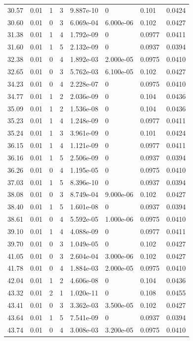 \documentclass[preview]{standalone}
\begin{document}
{{{\begin{tabular}{L{1.2cm}C{1.2cm} C{0.3cm}C{0.5cm} C{1.4cm}C{1.4cm} C{1.4cm}C{1.4cm}}
  30.57  &  0.01  & 1     &  3 &  9.887e-10  & 0  & 0.101 &  0.0424   \\ 
  30.60  &  0.01  & 0     &  3 &  6.069e-04  & 6.000e-06  & 0.102 &  0.0427   \\ 
  31.38  &  0.01  & 1     &  4 &  1.792e-09  & 0  & 0.0977 &  0.0411   \\ 
  31.60  &  0.01  & 1     &  5 &  2.132e-09  & 0  & 0.0937 &  0.0394   \\ 
  32.38  &  0.01  & 0     &  4 &  1.892e-03  & 2.000e-05  & 0.0975 &  0.0410   \\ 
  32.65  &  0.01  & 0     &  3 &  5.762e-03  & 6.100e-05  & 0.102 &  0.0427   \\ 
  34.23  &  0.01  & 0     &  4 &  2.228e-07  & 0  & 0.0975 &  0.0410   \\ 
  34.77  &  0.01  & 1     &  2 &  2.036e-09  & 0  & 0.104 &  0.0436   \\ 
  35.09  &  0.01  & 1     &  2 &  1.536e-08  & 0  & 0.104 &  0.0436   \\ 
  35.23  &  0.01  & 1     &  4 &  1.248e-09  & 0  & 0.0977 &  0.0411   \\ 
  35.24  &  0.01  & 1     &  3 &  3.961e-09  & 0  & 0.101 &  0.0424   \\ 
  36.15  &  0.01  & 1     &  4 &  1.121e-09  & 0  & 0.0977 &  0.0411   \\ 
  36.16  &  0.01  & 1     &  5 &  2.506e-09  & 0  & 0.0937 &  0.0394   \\ 
  36.26  &  0.01  & 0     &  4 &  1.195e-05  & 0  & 0.0975 &  0.0410   \\ 
  37.03  &  0.01  & 1     &  5 &  8.396e-10  & 0  & 0.0937 &  0.0394   \\ 
  38.08  &  0.01  & 0     &  3 &  8.749e-04  & 9.000e-06  & 0.102 &  0.0427   \\ 
  38.40  &  0.01  & 1     &  5 &  1.601e-08  & 0  & 0.0937 &  0.0394   \\ 
  38.61  &  0.01  & 0     &  4 &  5.592e-05  & 1.000e-06  & 0.0975 &  0.0410   \\ 
  39.10  &  0.01  & 1     &  4 &  4.088e-09  & 0  & 0.0977 &  0.0411   \\ 
  39.70  &  0.01  & 0     &  3 &  1.049e-05  & 0  & 0.102 &  0.0427   \\ 
  41.05  &  0.01  & 0     &  3 &  2.604e-04  & 3.000e-06  & 0.102 &  0.0427   \\ 
  41.78  &  0.01  & 0     &  4 &  1.884e-03  & 2.000e-05  & 0.0975 &  0.0410   \\ 
  42.04  &  0.01  & 1     &  2 &  4.606e-08  & 0  & 0.104 &  0.0436   \\ 
  43.32  &  0.01  & 2     &  1 &  1.020e-11  & 0  & 0.108 &  0.0455   \\ 
  43.41  &  0.01  & 0     &  3 &  3.362e-03  & 3.500e-05  & 0.102 &  0.0427   \\ 
  43.64  &  0.01  & 1     &  5 &  7.541e-09  & 0  & 0.0937 &  0.0394   \\ 
  43.74  &  0.01  & 0     &  4 &  3.008e-03  & 3.200e-05  & 0.0975 &  0.0410   \\ 
\hline 
\end{tabular} 

}}}
\end{document}
